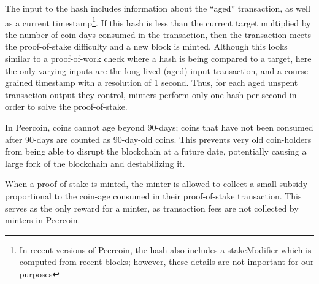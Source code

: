 The input to the hash includes information about the ``aged'' transaction, as
well as a current timestamp\footnote{In recent versions of Peercoin, the hash
also includes a stakeModifier which is computed from recent blocks; however,
these details are not important for our purposes}. If this hash is less than the
current target multiplied by the number of coin-days consumed in the
transaction, then the transaction meets the proof-of-stake difficulty and a new
block is minted. Although this looks similar to a proof-of-work check where a
hash is being compared to a target, here the only varying inputs are the
long-lived (aged) input transaction, and a course-grained timestamp with a
resolution of 1 second. Thus, for each aged unspent transaction output they
control, minters perform only one hash per second in order to solve the
proof-of-stake.

%



In Peercoin, coins cannot age beyond 90-days; coins that have not been consumed
after 90-days are counted as 90-day-old coins. This prevents very old
coin-holders from being able to disrupt the blockchain at a future date,
potentially causing a large fork of the blockchain and destabilizing it.

When a proof-of-stake is minted, the minter is allowed to collect a small
subsidy proportional to the coin-age consumed in their proof-of-stake
transaction. This serves as the only reward for a minter, as transaction fees are not
collected by minters in Peercoin.


